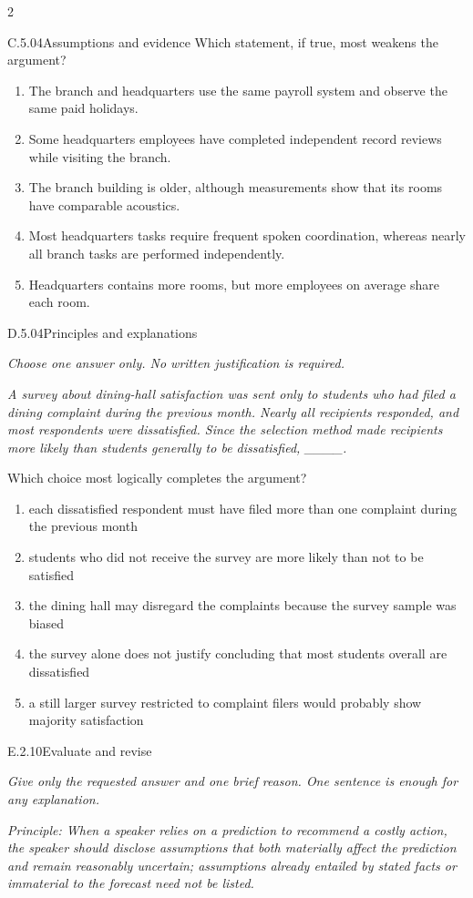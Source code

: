 \documentclass[9pt]{extarticle}
\newcommand{\choice}[1]{\item #1}
\begin{document}
\begin{multicols}{2}
\begin{DenseCoreProblem}{C.5.04}{Assumptions and evidence}
Which statement, if true, most weakens the argument?
\begin{enumerate}[label=(\alph*)]
  \choice{The branch and headquarters use the same payroll system and observe the same paid holidays.}
  \choice{Some headquarters employees have completed independent record reviews while visiting the branch.}
  \choice{The branch building is older, although measurements show that its rooms have comparable acoustics.}
  \choice{Most headquarters tasks require frequent spoken coordination, whereas nearly all branch tasks are performed independently.}
  \choice{Headquarters contains more rooms, but more employees on average share each room.}
\end{enumerate}
\end{DenseCoreProblem}
\begin{DenseCoreProblem}{D.5.04}{Principles and explanations}
{\scriptsize\textit{Choose one answer only. No written justification is required.}\par}
\emph{A survey about dining-hall satisfaction was sent only to students who had filed a dining complaint during the previous month. Nearly all recipients responded, and most respondents were dissatisfied. Since the selection method made recipients more likely than students generally to be dissatisfied, \_\_\_\_.}

Which choice most logically completes the argument?
\begin{enumerate}[label=(\alph*)]
  \choice{each dissatisfied respondent must have filed more than one complaint during the previous month}
  \choice{students who did not receive the survey are more likely than not to be satisfied}
  \choice{the dining hall may disregard the complaints because the survey sample was biased}
  \choice{the survey alone does not justify concluding that most students overall are dissatisfied}
  \choice{a still larger survey restricted to complaint filers would probably show majority satisfaction}
\end{enumerate}
\end{DenseCoreProblem}
\begin{DenseCoreProblem}{E.2.10}{Evaluate and revise}
{\scriptsize\textit{Give only the requested answer and one brief reason. One sentence is enough for any explanation.}\par}
\emph{Principle: When a speaker relies on a prediction to recommend a costly action, the speaker should disclose assumptions that both materially affect the prediction and remain reasonably uncertain; assumptions already entailed by stated facts or immaterial to the forecast need not be listed.}


\end{DenseCoreProblem}
\end{multicols}
\end{document}
